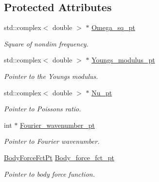 \subsection*{Protected Attributes}
\begin{DoxyCompactItemize}
\item 
std\+::complex$<$ double $>$ $\ast$ \hyperlink{classoomph_1_1TimeHarmonicFourierDecomposedLinearElasticityEquationsBase_a9a2cb5dee1b944a1fa91e1994431889b}{Omega\+\_\+sq\+\_\+pt}
\begin{DoxyCompactList}\small\item\em Square of nondim frequency. \end{DoxyCompactList}\item 
std\+::complex$<$ double $>$ $\ast$ \hyperlink{classoomph_1_1TimeHarmonicFourierDecomposedLinearElasticityEquationsBase_a7180e4550fa825ef2ce5721c66fe8910}{Youngs\+\_\+modulus\+\_\+pt}
\begin{DoxyCompactList}\small\item\em Pointer to the Young\textquotesingle{}s modulus. \end{DoxyCompactList}\item 
std\+::complex$<$ double $>$ $\ast$ \hyperlink{classoomph_1_1TimeHarmonicFourierDecomposedLinearElasticityEquationsBase_a49485f369ed9d1236c3ab84bf7bccfd7}{Nu\+\_\+pt}
\begin{DoxyCompactList}\small\item\em Pointer to Poisson\textquotesingle{}s ratio. \end{DoxyCompactList}\item 
int $\ast$ \hyperlink{classoomph_1_1TimeHarmonicFourierDecomposedLinearElasticityEquationsBase_a3d4a166655d1f7828f8b1323d7d3d943}{Fourier\+\_\+wavenumber\+\_\+pt}
\begin{DoxyCompactList}\small\item\em Pointer to Fourier wavenumber. \end{DoxyCompactList}\item 
\hyperlink{classoomph_1_1TimeHarmonicFourierDecomposedLinearElasticityEquationsBase_ac582edc989cd98af8a03f5bf58d7a05a}{Body\+Force\+Fct\+Pt} \hyperlink{classoomph_1_1TimeHarmonicFourierDecomposedLinearElasticityEquationsBase_a65c341e132adbe3baf9c3d6332f1212d}{Body\+\_\+force\+\_\+fct\+\_\+pt}
\begin{DoxyCompactList}\small\item\em Pointer to body force function. \end{DoxyCompactList}\end{DoxyCompactItemize}
